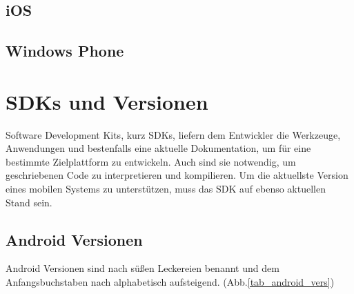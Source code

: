 \subsection{iOS}

\subsection{Windows Phone}

\section{SDKs und Versionen}
Software Development Kits, kurz SDKs, liefern dem Entwickler die Werkzeuge, Anwendungen und bestenfalls eine aktuelle Dokumentation, um für eine bestimmte Zielplattform zu entwickeln. Auch sind sie notwendig, um geschriebenen Code zu interpretieren und kompilieren. Um die aktuellste Version eines mobilen Systems zu unterstützen, muss das SDK auf ebenso aktuellen Stand sein.

\subsection{Android Versionen}
Android Versionen sind nach süßen Leckereien benannt und dem Anfangsbuchstaben nach alphabetisch aufsteigend. (Abb.\ref{tab_android_vers})

